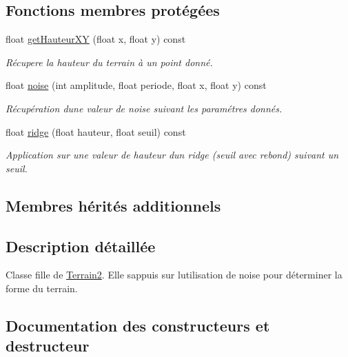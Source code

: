 \subsection*{Fonctions membres protégées}
\begin{DoxyCompactItemize}
\item 
float \hyperlink{class_terrain_noise_a4173f17958ed358f9b4a6b005b0ed256}{get\+Hauteur\+X\+Y} (float x, float y) const 
\begin{DoxyCompactList}\small\item\em Récupere la hauteur du terrain à un point donné. \end{DoxyCompactList}\item 
float \hyperlink{class_terrain_noise_aa22eddb4730bc005cebc2d6d62c437d6}{noise} (int amplitude, float periode, float x, float y) const 
\begin{DoxyCompactList}\small\item\em Récupération d\textquotesingle{}une valeur de noise suivant les paramétres donnés. \end{DoxyCompactList}\item 
float \hyperlink{class_terrain_noise_ad3dc579820ae6931c246406f55bbe5b0}{ridge} (float hauteur, float seuil) const 
\begin{DoxyCompactList}\small\item\em Application sur une valeur de hauteur d\textquotesingle{}un ridge (seuil avec rebond) suivant un seuil. \end{DoxyCompactList}\end{DoxyCompactItemize}
\subsection*{Membres hérités additionnels}


\subsection{Description détaillée}
Classe fille de \hyperlink{class_terrain2}{Terrain2}. Elle s\textquotesingle{}appuis sur l\textquotesingle{}utilisation de noise pour déterminer la forme du terrain. 

\subsection{Documentation des constructeurs et destructeur}
\hypertarget{class_terrain_noise_ade7285caeec8d121790159ad6b0af25f}{}
